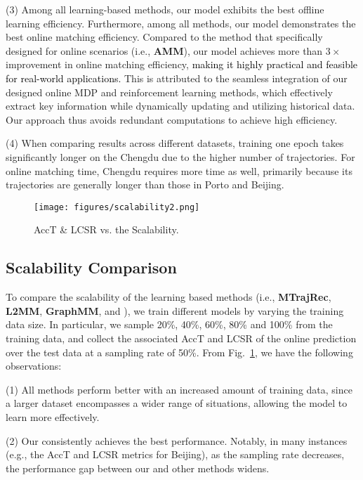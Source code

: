 \noindent (3) Among all learning-based methods, our model exhibits the best offline learning efficiency. Furthermore, among all methods, our model demonstrates the best online matching efficiency. Compared to the method that specifically designed for online scenarios (i.e., \textbf{AMM}), our model achieves more than $3\times$ improvement in online matching efficiency, \textcolor{black}{making it highly practical and feasible for real-world applications.} 
This is attributed to the seamless integration of our designed online MDP and reinforcement learning methods, which effectively extract key information while dynamically updating and utilizing historical data. Our approach thus avoids redundant computations to achieve high efficiency.

\noindent (4) When comparing results across different datasets, training one epoch takes significantly longer on the Chengdu due to the higher number of trajectories. For online matching time, Chengdu requires more time as well, primarily because its trajectories are generally longer than those in Porto and Beijing.

\begin{figure}
  \centering  
  \texttt{[image: figures/scalability2.png]}
  \vspace{-0.15in}
  \caption{AccT \& LCSR vs. the Scalability.}
  \vspace{-0.15in}
  \label{fig:scalability}
\end{figure}
\subsection{Scalability Comparison}
To compare the scalability of the learning based methods (i.e., \textbf{MTrajRec}, \textbf{L2MM}, \textbf{GraphMM}, and \textbf{\modelName}), we train different models by varying the training data size. In particular, we sample 20\%, 40\%, 60\%, 80\% and 100\% from the training data, and collect the associated AccT and LCSR of the online prediction over the test data at a sampling rate of 50\%. From Fig.~\ref{fig:scalability}, we have the following observations:

\noindent(1) All methods perform better with an increased amount of training data, since a larger dataset encompasses a wider range of situations, allowing the model to learn more effectively.

\noindent(2) Our \textbf{\modelName} consistently achieves the best performance. Notably, in many instances (e.g., the AccT and LCSR metrics for Beijing), as the sampling rate decreases, the performance gap between our \textbf{\modelName} and other methods widens.


